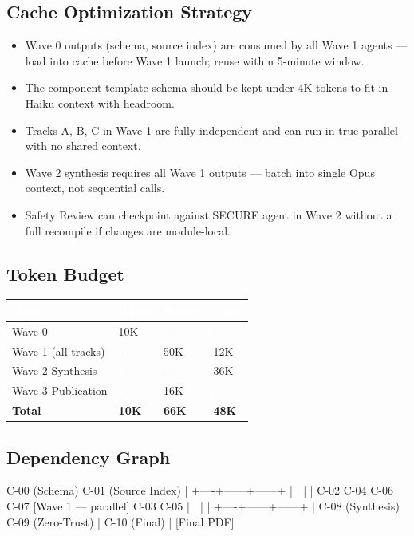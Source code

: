 \documentclass[11pt,letterpaper]{article}
\newcommand{\tableheader}[1]{\textbf{\sffamily\textcolor{white}{#1}}}
\begin{document}
\subsection{Cache Optimization Strategy}

\begin{itemize}[leftmargin=1.5em]
  \item Wave 0 outputs (schema, source index) are consumed by all Wave 1 agents --- load into cache before Wave 1 launch; reuse within 5-minute window.
  \item The component template schema should be kept under 4K tokens to fit in Haiku context with headroom.
  \item Tracks A, B, C in Wave 1 are fully independent and can run in true parallel with no shared context.
  \item Wave 2 synthesis requires all Wave 1 outputs --- batch into single Opus context, not sequential calls.
  \item Safety Review can checkpoint against SECURE agent in Wave 2 without a full recompile if changes are module-local.
\end{itemize}

\subsection{Token Budget}

\begin{center}
\begin{tabularx}{\textwidth}{L{4cm}C{2cm}C{2cm}C{2cm}}
\toprule
{}
\tableheader{Wave} & \tableheader{Haiku} & \tableheader{Sonnet} & \tableheader{Opus} \\
\midrule
Wave 0 & 10K & -- & -- \\
Wave 1 (all tracks) & -- & 50K & 12K \\
Wave 2 Synthesis & -- & -- & 36K \\
Wave 3 Publication & -- & 16K & -- \\
\midrule
\textbf{Total} & \textbf{10K} & \textbf{66K} & \textbf{48K} \\
\bottomrule
\end{tabularx}
\end{center}

\subsection{Dependency Graph}

\begin{asciibox}
C-00 (Schema)
C-01 (Source Index)
    |
    +----+------+------+
    |    |      |      |
  C-02  C-04  C-06   C-07    [Wave 1 --- parallel]
  C-03  C-05
    |    |      |      |
    +----+------+------+
              |
           C-08 (Synthesis)
           C-09 (Zero-Trust)
              |
           C-10 (Final)
              |
          [Final PDF]
\end{asciibox}
\end{document}
